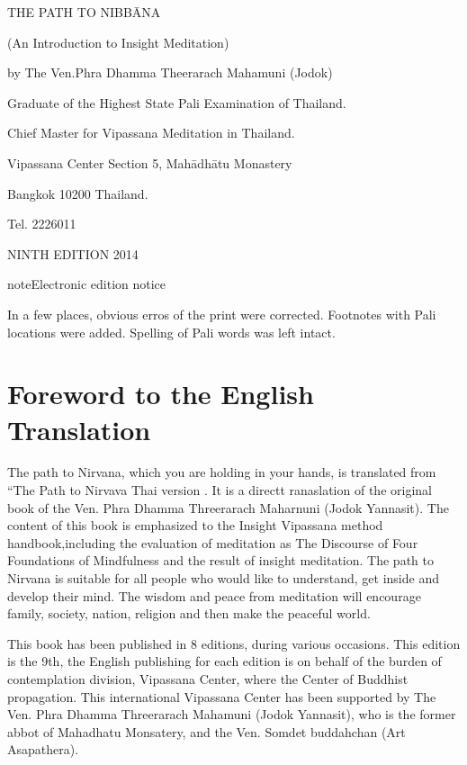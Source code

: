 \documentclass[a5paper,10pt,english]{book}
\begin{document}
\setcounter{section}{0}

\begin{DUlineblock}{0em}
\item[] THE PATH TO NIBBĀNA
\item[] (An Introduction to Insight Meditation)
\item[] by The Ven.Phra Dhamma Theerarach Mahamuni (Jodok)
\item[] Graduate of the Highest State Pali Examination of Thailand.
\item[] Chief Master for Vipassana Meditation in Thailand.
\item[] 
\item[] Vipassana Center Section 5, Mahādhātu Monastery
\item[] Bangkok 10200 Thailand.
\item[] Tel. 2226011
\item[] 
\item[] NINTH EDITION 2014
\end{DUlineblock}

\begin{sphinxadmonition}{note}{Electronic edition notice}

\sphinxAtStartPar
In a few places, obvious erros of the print were corrected. Footnotes with Pali locations were added. Spelling of Pali words was left intact.
\end{sphinxadmonition}

\clearpage


\section{Foreword to the English Translation}
\label{\detokenize{front:foreword-to-the-english-translation}}
\sphinxAtStartPar
The path to Nirvana, which you are holding in your hands, is translated from “The Path to Nirvava\sphinxhyphen{} Thai version \sphinxhyphen{}. It is a directt ranaslation of the original book of the Ven. Phra Dhamma Threerarach Maharnuni (Jodok Yannasit). The content of this book is emphasized to the Insight Vipassana method handbook,including the evaluation of meditation as The Discourse of Four Foundations of Mindfulness and the result of insight meditation. The path to Nirvana is suitable for all people who would like to understand, get inside and develop their mind. The wisdom and peace from meditation will encourage family, society, nation, religion and then make the peaceful world.

\sphinxAtStartPar
This book has been published in 8 editions, during various occasions. This edition is the 9th, the English publishing for each edition is on behalf of the burden of contemplation division, Vipassana Center, where the Center of Buddhist propagation. This international Vipassana Center has been supported by The Ven. Phra Dhamma Threerarach Mahamuni (Jodok Yannasit), who is the former abbot of Mahadhatu Monsatery, and the Ven. Somdet buddahchan (Art Asapathera).
\end{document}
